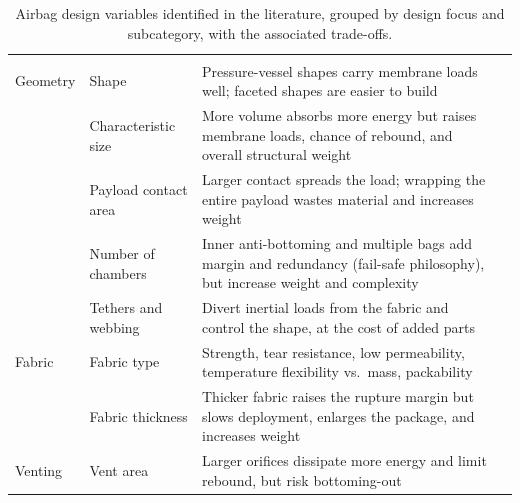 {\longtablesetup
\begin{longtable}{G{0.13} L{0.17} L{0.46} L{0.24}}
\caption{Airbag design variables identified in the literature, grouped by design focus and subcategory, with the associated trade-offs.}
\label{tab:variable_inventory}\\
\headrow{} &  &  &  \\
\endfirsthead
\headrow{} &  &  &  \\
\endhead
{}
\endfoot
\lastrule
\endlastfoot

Geometry
  & Shape & Pressure-vessel shapes carry membrane loads well; faceted shapes are easier to build & \cite{Zhou2019,Smith2007,Tutt2008,TaylorGardinier1999,DoDeWeck2012,Shen2025} \\
& Characteristic size & More volume absorbs more energy but raises membrane loads, chance of rebound, and overall structural weight & \cite{Smith2007,DoDeWeck2012,WarrickLee2001,Peng2021} \\
& Payload contact area & Larger contact spreads the load; wrapping the entire payload wastes material and increases weight & \cite{Tutt2008,GardinierTaylor1999,TaylorGardinier1999} \\
& Number of chambers & Inner anti-bottoming and multiple bags add margin and redundancy (fail-safe philosophy), but increase weight and complexity & \cite{Zhou2019,DoDeWeck2012,Tutt2008,GardinierTaylor1999,Smith2007,HolnickiSzulc2009} \\
& Tethers and webbing & Divert inertial loads from the fabric and control the shape, at the cost of added parts & \cite{Shen2025,Tutt2008,Tutt2009} \\
\grouprule
Fabric
  & Fabric type & Strength, tear resistance, low permeability, temperature flexibility vs.\ mass, packability & \cite{Cadogan2002,Tutt2008,Tutt2009,GardinierTaylor1999,Shen2025,Verma2025,Alekseychuk2024,CasidayFrey2000,Hirth2007,Lee2009,Dobrich2014} \\
& Fabric thickness & Thicker fabric raises the rupture margin but slows deployment, enlarges the package, and increases weight & \cite{Yang2015,Lim2015,DoDeWeck2012} \\
\grouprule
Venting
  & Vent area & Larger orifices dissipate more energy and limit rebound, but risk bottoming-out & \cite{Smith2007,DoDeWeck2012,Cole1993} \\

\end{longtable}}
